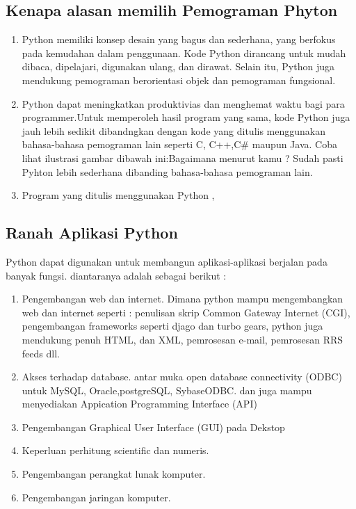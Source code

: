 \subsection {Kenapa alasan memilih Pemograman Phyton}
\begin {enumerate}
\item Python memiliki konsep desain yang bagus dan sederhana, yang berfokus pada kemudahan dalam penggunaan. Kode Python dirancang untuk mudah dibaca, dipelajari, digunakan ulang, dan dirawat. Selain itu, Python juga mendukung pemograman berorientasi objek dan pemograman fungsional.
\item Python dapat meningkatkan produktivias dan menghemat waktu bagi para programmer.Untuk memperoleh hasil program yang sama, kode Python juga jauh lebih sedikit dibandngkan dengan kode yang ditulis menggunakan bahasa-bahasa pemograman lain seperti C, C++,C# maupun Java. Coba lihat ilustrasi gambar dibawah ini:Bagaimana menurut kamu ? Sudah pasti Pyhton lebih sederhana dibanding bahasa-bahasa pemograman lain.
\item Program yang ditulis menggunakan Python ,
\end {enumerate}

\subsection {Ranah Aplikasi Python}
Python dapat digunakan untuk membangun aplikasi-aplikasi berjalan pada banyak fungsi. diantaranya adalah sebagai berikut :
\begin {enumerate}
\item Pengembangan web dan internet. Dimana python mampu mengembangkan web dan internet seperti : penulisan skrip Common Gateway Internet (CGI), pengembangan frameworks seperti djago dan turbo gears, python juga mendukung penuh HTML, dan XML, pemrosesan e-mail, pemrosesan RRS feeds dll.
\item Akses terhadap database. antar muka open database connectivity (ODBC) untuk MySQL, Oracle,postgreSQL, SybaseODBC. dan juga mampu menyediakan Appication Programming Interface (API)
\item Pengembangan Graphical User Interface (GUI) pada Dekstop
\item Keperluan perhitung scientific dan numeris.
\item Pengembangan perangkat lunak komputer.
\item Pengembangan jaringan komputer.
\end {enumerate}

